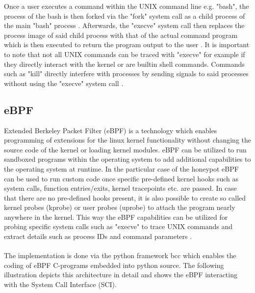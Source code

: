 Once a user executes a command within the UNIX command line e.g. "bash", the process of the bash is then forked via the "fork" system call as a child process of the main "bash" process \cite{fork}. Afterwards, the "execve" system call then replaces the process image of said child process with that of the actual command program which is then executed to return the program output to the user \cite{execve}. It is important to note that not all UNIX commands can be traced with "execve" for example if they directly interact with the kernel or are builtin shell commands. Commands such as "kill" directly interfere with processes by sending signals to said processes without using the "execve" system call \cite{kill}.





\subsection{eBPF}
Extended Berkeley Packet Filter (eBPF) is a technology which enables programming of extensions for the linux kernel functionality without changing the source code of the kernel or loading kernel modules. eBPF can be utilized to run sandboxed programs within the operating system to add additional capabilities to the operating system at runtime. In the particular case of the honeypot eBPF can be used to run custom code once specific pre-defined kernel hooks such as system calls, function entries/exits, kernel tracepoints etc. are passed. In case that there are no pre-defined hooks present, it is also possible to create so called kernel probes (kprobe) or user probes (uprobe) to attach the program nearly anywhere in the kernel. This way the eBPF capabilities can be utilized for probing specific system calls such as "execve" to trace UNIX commands and extract details such as process IDs and command parameters \cite{bcc}.\\\\ The implementation is done via the python framework bcc which enables the coding of eBPF C-programs embedded into python source. The following illustration depicts this architecture in detail and shows the eBPF interacting with the System Call Interface (SCI). 

